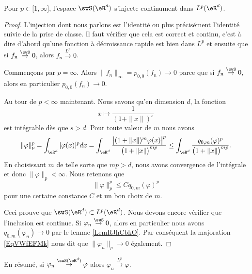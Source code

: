 \begin{proposition}     \label{PropGNXBeME}
    Pour \( p\in\mathopen[ 1 , \infty \mathclose]\), l'espace \( \swS(\eR^d)\) s'injecte continument dans \( L^p(\eR^d)\). 
\end{proposition}

\begin{proof}
    L'injection dont nous parlons est l'identité ou plus précisément l'identité suivie de la prise de classe. Il faut vérifier que cela est correct et continu, c'est à dire d'abord qu'une fonction à décroissance rapide est bien dans \( L^p\) et ensuite que si \( f_n\stackrel{\swS}{\to}0\), alors \( f_n\stackrel{L^p}{\to}0\).
    
    Commençons par \( p=\infty\). Alors \( \| f_n \|_{\infty}=p_{0,0}(f_n)\to 0\) parce que si \( f_n\stackrel{\swS}{\to}0\), alors en particulier \( p_{0,0}(f_n)\to 0\).

    Au tour de \( p<\infty\) maintenant. Nous savons qu'en dimension \( d\), la fonction
    \begin{equation}
        x\mapsto \frac{1}{ (1+\| x \|)^s }
    \end{equation}
    est intégrable dès que \( s>d\).
    Pour toute valeur de \( m\) nous avons
    \begin{equation}
        \| \varphi \|_p^p=\int_{\eR^d}| \varphi(x) |^pdx=\int_{\eR^d}\frac{ \big|    (1+\| x \|)^m\varphi(x)   \big|^p }{ \big( 1+\| x \| \big)^{mp} }\leq\int_{\eR^d}\frac{q_{0,m}(\varphi)^p}{ \big( 1+\| x \| \big)^{mp} }.
    \end{equation}
    En choisissant \( m\) de telle sorte que \( mp>d\), nous avons convergence de l'intégrale et donc \( \| \varphi \|_p<\infty\). Nous retenons que
    \begin{equation}    \label{EqVWfEFMk}
        \| \varphi \|_p^p\leq Cq_{0,m}(\varphi)^p
    \end{equation}
    pour une certaine constance \( C\) et un bon choix de \( m\).

    Ceci prouve que \( \swS(\eR^d)\subset L^p(\eR^d)\). Nous devons encore vérifier que l'inclusion est continue. Si \( \varphi_n\stackrel{\swS}{\to}0\), alors en particulier nous avons \( q_{0,m}(\varphi_n)\to 0\) par le lemme \ref{LemRJhCbkO}. Par conséquent la majoration \eqref{EqVWfEFMk} nous dit que \( \| \varphi_n \|_p\to 0\) également.

\end{proof}
En résumé, si \( \varphi_n\stackrel{\swS(\eR^d)}{\to}\varphi\) alors \( \varphi_n\stackrel{L^p}{\to}\varphi\).

